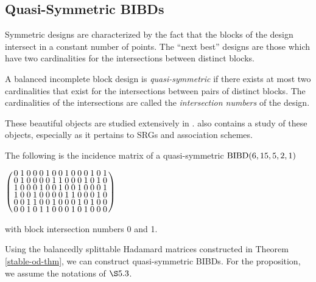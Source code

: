 \documentclass[../../../main]{subfiles}
\begin{document}
\subsection{Quasi-Symmetric BIBDs}

Symmetric designs are characterized by the fact that the blocks of the design intersect in a constant number of points. The ``next best'' designs are those which have two cardinalities for the intersections between distinct blocks.

\begin{defin}
 A balanced incomplete block design is {\it quasi-symmetric} if there exists at
 most two cardinalities that exist for the intersections between pairs of distinct
 blocks. The cardinalities of the intersections are called the {\it intersection
   numbers} of the design.
\end{defin}

These beautiful objects are studied extensively in \cite{quasi-symmetric-shrikhande}. \cite{combinatorics-of-symmetric-designs} also contains a study of these objects, especially as it pertains to SRGs and association schemes. 

\begin{ex}
 The following is the incidence matrix of a quasi-symmetric $\text{BIBD}(6,15,5,2,1)$
 \begin{defenum}
  \item\label{quasi-sym-ex} $
  \arraycolsep=1.25pt\def\arraystretch{0.625}
  \left(\begin{array}{rrrrrrrrrrrrrrr}
0 & 1 & 0 & 0 & 0 & 1 & 0 & 0 & 1 & 0 & 0 & 0 & 1 & 0 & 1 \\
0 & 1 & 0 & 0 & 0 & 0 & 1 & 1 & 0 & 0 & 0 & 1 & 0 & 1 & 0 \\
1 & 0 & 0 & 0 & 1 & 0 & 0 & 1 & 0 & 0 & 1 & 0 & 0 & 0 & 1 \\
1 & 0 & 0 & 1 & 0 & 0 & 0 & 0 & 1 & 1 & 0 & 0 & 0 & 1 & 0 \\
0 & 0 & 1 & 1 & 0 & 0 & 1 & 0 & 0 & 0 & 1 & 0 & 1 & 0 & 0 \\
0 & 0 & 1 & 0 & 1 & 1 & 0 & 0 & 0 & 1 & 0 & 1 & 0 & 0 & 0
\end{array}\right)
  $
 \end{defenum}
 with block intersection numbers 0 and 1.
\end{ex}

Using the balancedly splittable Hadamard matrices constructed in Theorem
\ref{stable-od-thm}, we can construct quasi-symmetric BIBDs. For the proposition,
we assume the notations of $\S5.3$. 
\end{document}
